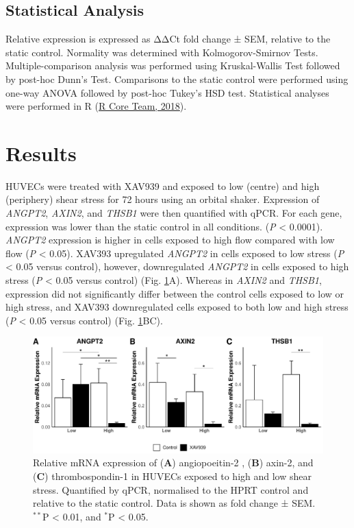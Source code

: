 \documentclass[
  12pt,
]{article}
\begin{document}
\hypertarget{statistical-analysis}{%
\subsection{Statistical Analysis}\label{statistical-analysis}}

Relative expression is expressed as ΔΔCt fold change ± SEM, relative to the static control. Normality was determined with Kolmogorov-Smirnov Tests. Multiple-comparison analysis was performed using Kruskal-Wallis Test followed by post-hoc Dunn's Test. Comparisons to the static control were performed using one-way ANOVA followed by post-hoc Tukey's HSD test. Statistical analyses were performed in R (\protect\hyperlink{ref-R}{R Core Team, 2018}).

\hypertarget{results}{%
\section{Results}\label{results}}

HUVECs were treated with XAV939 and exposed to low (centre) and high (periphery) shear stress for 72 hours using an orbital shaker. Expression of \emph{ANGPT2}, \emph{AXIN2}, and \emph{THSB1} were then quantified with qPCR. For each gene, expression was lower than the static control in all conditions. (\emph{P} \textless{} 0.0001). \emph{ANGPT2} expression is higher in cells exposed to high flow compared with low flow (\emph{P} \textless{} 0.05). XAV393 upregulated \emph{ANGPT2} in cells exposed to low stress (\emph{P} \textless{} 0.05 versus control), however, downregulated \emph{ANGPT2} in cells exposed to high stress (\emph{P} \textless{} 0.05 versus control) (Fig. \ref{fig:plots}A). Whereas in \emph{AXIN2} and \emph{THSB1}, expression did not significantly differ between the control cells exposed to low or high stress, and XAV393 downregulated cells exposed to both low and high stress (\emph{P} \textless{} 0.05 versus control) (Fig. \ref{fig:plots}BC).

\begin{figure}
\centering
\includegraphics{report_files/figure-latex/plots-1.pdf}
\caption{\label{fig:plots}Relative mRNA expression of (\textbf{A}) angiopoeitin-2 , (\textbf{B}) axin-2, and (\textbf{C}) thrombospondin-1 in HUVECs exposed to high and low shear stress. Quantified by qPCR, normalised to the HPRT control and relative to the static control. Data is shown as fold change ± SEM. \(^{**}\)P \textless{} 0.01, and \(^*\)P \textless{} 0.05.}
\end{figure}
\end{document}
